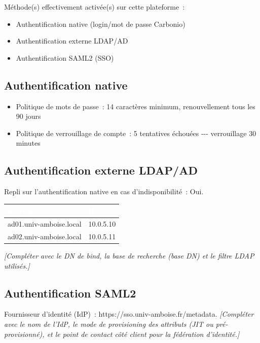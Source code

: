 \documentclass[11pt,a4paper]{report}
\newcommand{\placeholder}[1]{\textit{\textcolor{placeholdercol}{[#1]}}\par\vspace{4pt}}
\newcommand{\tblhead}[1]{\textcolor{white}{\textbf{#1}}}
\begin{document}
Méthode(s) effectivement activée(s) sur cette plateforme~:
\begin{itemize}[nosep]
  \item Authentification native (login/mot de passe Carbonio)
  \item Authentification externe LDAP/AD
  \item Authentification SAML2 (SSO)
\end{itemize}

\subsection{Authentification native}
\begin{itemize}[nosep]
  \item Politique de mots de passe~: 14 caractères minimum, renouvellement tous les 90 jours
  \item Politique de verrouillage de compte~: 5 tentatives échouées -\allowbreak{}-\allowbreak{}-\allowbreak{} verrouillage 30 minutes
\end{itemize}

\subsection{Authentification externe LDAP/AD}
Repli sur l'authentification native en cas d'indisponibilité~: Oui.

\begin{longtable}{|p{5.5cm}|p{5.5cm}|}
\hline
\rowcolor{primary}\tblhead{Serveur} & \tblhead{IP} \\
\hline
\endhead
ad01.\allowbreak{}univ-\allowbreak{}amboise.\allowbreak{}local & 10.\allowbreak{}0.\allowbreak{}5.\allowbreak{}10 \\
\hline
ad02.\allowbreak{}univ-\allowbreak{}amboise.\allowbreak{}local & 10.\allowbreak{}0.\allowbreak{}5.\allowbreak{}11 \\
\hline
\end{longtable}
\placeholder{Compléter avec le DN de bind, la base de recherche (base DN) et le filtre LDAP utilisés.}

\subsection{Authentification SAML2}
Fournisseur d'identité (IdP)~: https://sso.\allowbreak{}univ-\allowbreak{}amboise.\allowbreak{}fr/metadata.
\placeholder{Compléter avec le nom de l'IdP, le mode de provisioning des attributs (JIT ou pré-provisionné), et le point de contact côté client pour la fédération d'identité.}
\end{document}
